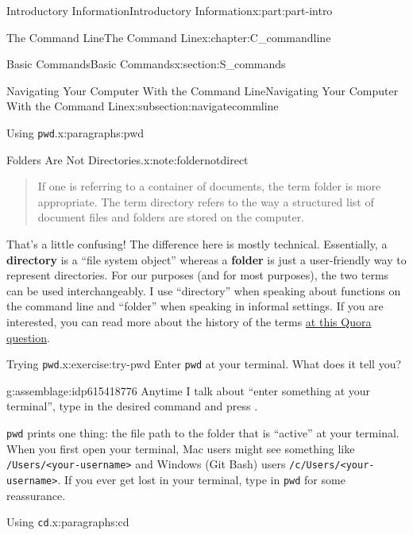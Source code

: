 \documentclass[oneside,10pt,]{book}
\newcommand{\mono}[1]{\texttt{#1}}
\newcommand{\terminology}[1]{\textbf{#1}}
\newcommand{\kbd}[1]{\keys{{#1}}}
\begin{document}
\begin{partptx}{Introductory Information}{}{Introductory Information}{}{}{x:part:part-intro}
\begin{chapterptx}{The Command Line}{}{The Command Line}{}{}{x:chapter:C_commandline}
\begin{sectionptx}{Basic Commands}{}{Basic Commands}{}{}{x:section:S_commands}
\begin{subsectionptx}{Navigating Your Computer With the Command Line}{}{Navigating Your Computer With the Command Line}{}{}{x:subsection:navigatecommline}
\begin{paragraphs}{Using \mono{pwd}.}{x:paragraphs:pwd}
\begin{note}{Folders Are Not Directories.}{x:note:foldernotdirect}
\begin{quote}
If one is referring to a container of documents, the term folder is more appropriate. The term directory refers to the way a structured list of document files and folders are stored on the computer.\end{quote}
 That's a little confusing! The difference here is mostly technical. Essentially, a \terminology{directory} is a ``file system object'' whereas a \terminology{folder} is just a user-friendly way to represent directories. For our purposes (and for most purposes), the two terms can be used interchangeably. I use ``directory'' when speaking about functions on the command line and ``folder'' when speaking in informal settings. If you are interested, you can read more about the history of the terms \href{https://www.quora.com/What-is-the-difference-between-a-folder-and-a-directory}{at this Quora question}\footnotemark{}.%
\end{note}
%
%
%
\begin{inlineexercise}{Trying \mono{pwd}.}{x:exercise:try-pwd}%
Enter \mono{pwd} at your terminal. What does it tell you?%
\end{inlineexercise}%
\begin{assemblage}{}{g:assemblage:idp615418776}%
Anytime I talk about ``enter something at your terminal'', type in the desired command and press \kbd{Enter}.%
\end{assemblage}
\mono{pwd} prints one thing: the file path to the folder that is ``active'' at your terminal. When you first open your terminal, Mac users might see something like \mono{/Users/<your-username>} and Windows (Git Bash) users \mono{/c/Users/<your-username>}. If you ever get lost in your terminal, type in \mono{pwd} for some reassurance.%
\end{paragraphs}%
\begin{paragraphs}{Using \mono{cd}.}{x:paragraphs:cd}%
\index{\mono{cd}}%
%
%
%
\index{command line!\mono{cd}}%

\end{paragraphs}
\end{subsectionptx}
\end{sectionptx}
\end{chapterptx}
\end{partptx}
\end{document}
